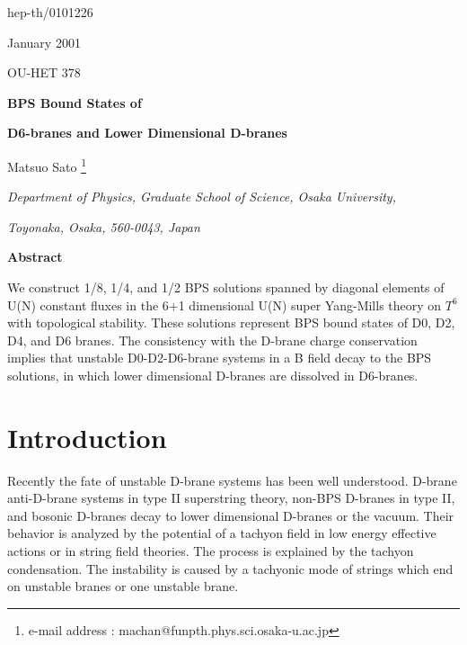 \documentclass[a4paper,12pt]{article}
\begin{document}
\begin{flushright}
hep-th/0101226

January 2001

OU-HET 378
\end{flushright}

\begin{center}

\vspace{3cm}

\textbf{\large BPS Bound States of}

\textbf{\large D6-branes and Lower Dimensional D-branes }

\vspace{2cm}

Matsuo Sato \footnote{e-mail address : machan@funpth.phys.sci.osaka-u.ac.jp}

\vspace{1cm}

\textit{Department of Physics, Graduate School of Science, Osaka University, }

\textit{Toyonaka, Osaka, 560-0043, Japan}

\vspace{1cm}

\textbf{Abstract}

\end{center}
We construct 1/8, 1/4, and 1/2 BPS solutions spanned by diagonal elements of U(N) constant fluxes in the 6+1 dimensional U(N) super Yang-Mills theory on $T^6$ with topological stability. These solutions represent BPS bound states of D0, D2, D4, and D6 branes. The consistency with the D-brane charge conservation implies that unstable D0-D2-D6-brane systems in a B field decay to the BPS solutions, in which lower dimensional D-branes are dissolved in  D6-branes.        

\newpage

\section{Introduction}
Recently the fate of unstable D-brane systems has been well understood. D-brane anti-D-brane systems in type II superstring theory, non-BPS D-branes in type II, and bosonic D-branes decay to lower dimensional D-branes or the vacuum. Their behavior is analyzed by the potential of a tachyon field in low energy effective actions or in string field theories. The process is explained by the tachyon condensation. The instability is caused by a tachyonic mode of strings which end on unstable branes or one unstable brane.
\end{document}
